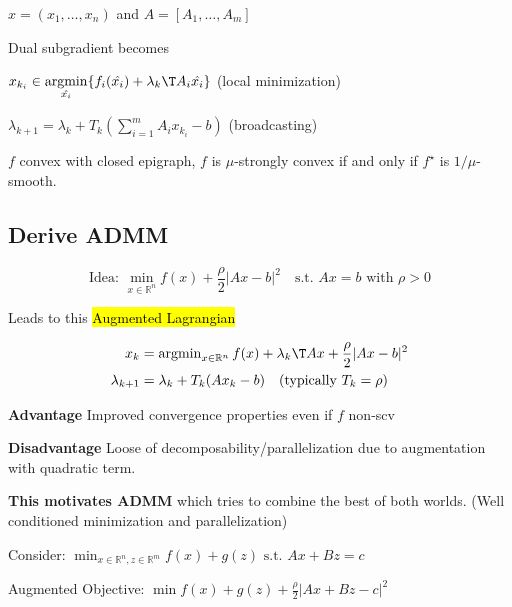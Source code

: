 $x = (x_1,\dots,x_n)$ and $A=[A_1,\dots,A_m]$

Dual subgradient becomes

$x_{k_i}\in \underset{\hat{x_i}} {\operatorname{argmin}} \{f_i(\hat{x_i})+\lambda_{k}\T A_i\hat{x_i}\}$
(local minimization)


$\lambda_{k+1}=\lambda_{k}+T_k(\sum_{i = 1}^{m}A_ix_{k_i}-b)$
(broadcasting)

\begin{proposition}
	$f$ convex with closed epigraph, $f$ is $\mu$-strongly convex
	if and only if $f^\star$ is $1/\mu$-smooth.
\end{proposition}

%
%
%
%

\subsection{Derive ADMM}
$$
	\text{Idea: }
	\min_{x \in \mathbb{R}^{n}}f(x)+ \frac{\rho}{2}|Ax-b|^2
	\quad\text{s.t. }Ax=b\text{ with }\rho > 0
$$

Leads to this \textcolor{hltext}{\hl{ Augmented Lagrangian }}

$$\begin{aligned}
		x_k           & =\operatorname{argmin}_{x\in\mathbb{R}^{n}}
		f(x)+\lambda_k\T Ax+\frac{\rho}{2}|Ax-b|^2
		\\
		\lambda_{k+1} & = \lambda_k+T_k(Ax_k-b)
		\quad\text{(typically }T_k=\rho)
	\end{aligned}$$

\textbf{Advantage}
Improved convergence properties even if
$f$ non-scv

\textbf{Disadvantage}
Loose of decomposability/parallelization
due to augmentation with quadratic term.

\textbf{This motivates ADMM} which tries to combine
the best of both worlds.
(Well conditioned minimization and parallelization)


Consider:
$\min_{x \in \mathbb{R}^{n},z \in \mathbb{R}^{m}} f(x) + g(z)
	\text{ s.t. } Ax+Bz=c$

Augmented Objective:
$\min f(x) + g(z)+\frac{\rho}{2}|Ax+Bz-c|^2$


